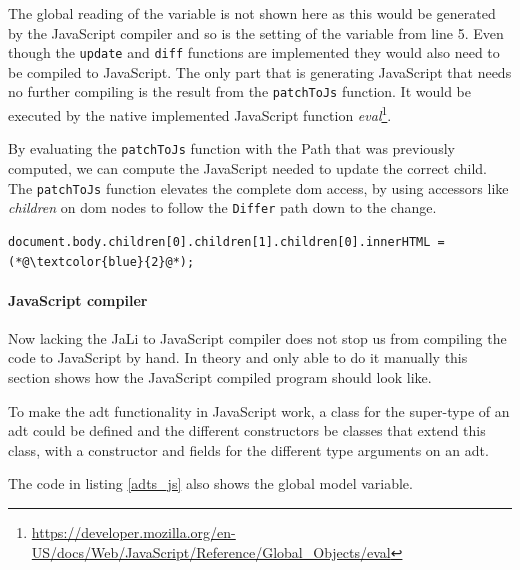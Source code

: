 The global reading of the variable is not shown here as this would be generated by the JavaScript compiler and so is the setting of the variable from line 5. Even though the \texttt{update} and \texttt{diff} functions are implemented they would also need to be compiled to JavaScript. The only part that is generating JavaScript that needs no further compiling is the result from the \texttt{patchToJs} function. It would be executed by the native implemented JavaScript function \textit{eval}\footnote{\url{https://developer.mozilla.org/en-US/docs/Web/JavaScript/Reference/Global_Objects/eval}}.

By evaluating the \texttt{patchToJs} function with the Path that was previously computed, we can compute the JavaScript needed to update the correct child. The \texttt{patchToJs} function elevates the complete \gls{dom} access, by using accessors like \textit{children} on \gls{dom} nodes to follow the \texttt{Differ} path down to the change.



\begin{lstlisting}[columns=fullflexible, label={patch_to_js_result}, language=JaLi, caption=JavaScript that patches the view]
document.body.children[0].children[1].children[0].innerHTML = (*@\textcolor{blue}{2}@*);
\end{lstlisting}

\paragraph{JavaScript compiler} Now lacking the JaLi to JavaScript compiler does not stop us from compiling the code to JavaScript by hand. In theory and only able to do it manually this section shows how the JavaScript compiled program should look like.

To make the \gls{adt} functionality in JavaScript work, a class for the super-type of an \gls{adt} could be defined and the different constructors be classes that extend this class, with a constructor and fields for the different type arguments on an \gls{adt}.



The code in listing \ref{adts_js} also shows the global model variable.

